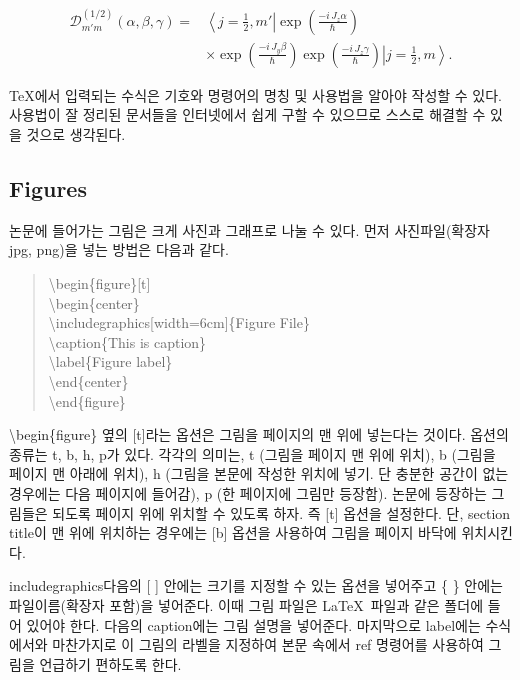 \documentclass{gshs-report-v1.1}
\begin{document}
\begin{equation}
\begin{split}
\mathcal{D}_{m'm}^{(1/2)} (\alpha,\beta,\gamma)=&\left\langle j=\frac{1}{2},m'\right|\exp\left(\frac{-i\,J_z \alpha}{\hbar}\right)\\
&\times\exp\left(\frac{-i\,J_y \beta}{\hbar}\right)\exp\left(\frac{-i\,J_z \gamma}{\hbar}\right)\left| j=\frac{1}{2},m\right\rangle.
\end{split}
\label{eq004}
\end{equation}

\TeX 에서 입력되는 수식은 기호와 명령어의 명칭 및 사용법을 알아야 작성할 수 있다. 사용법이 잘 정리된 문서들을 인터넷에서 쉽게 구할 수 있으므로 스스로 해결할 수 있을 것으로 생각된다.


\subsection{Figures}
논문에 들어가는 그림은 크게 사진과 그래프로 나눌 수 있다. 먼저 사진파일(확장자 jpg, png)을 넣는 방법은 다음과 같다.
\begin{quote}
	{\textbackslash}begin\{figure\}[t]\\
	{\textbackslash}begin\{center\}\\
	{\textbackslash}includegraphics[width=6cm]\{Figure File\}\\
	{\textbackslash}caption\{This is caption\}\\
	{\textbackslash}label\{Figure label\}\\
	{\textbackslash}end\{center\}\\
	{\textbackslash}end\{figure\}
\end{quote}
{\textbackslash}begin\{figure\} 옆의 [t]라는 옵션은 그림을 페이지의 맨 위에 넣는다는 것이다. 옵션의 종류는 t, b, h, p가 있다. 각각의 의미는, t (그림을 페이지 맨 위에 위치), b (그림을 페이지 맨 아래에 위치), h (그림을 본문에 작성한 위치에 넣기. 단 충분한 공간이 없는 경우에는 다음 페이지에 들어감), p (한 페이지에 그림만 등장함). 논문에 등장하는 그림들은 되도록 페이지 위에 위치할 수 있도록 하자. 즉 [t] 옵션을 설정한다. 단, section title이 맨 위에 위치하는 경우에는 [b] 옵션을 사용하여 그림을 페이지 바닥에 위치시킨다.

includegraphics다음의 [ ] 안에는 크기를 지정할 수 있는 옵션을 넣어주고 \{ \} 안에는 파일이름(확장자 포함)을 넣어준다. 이때 그림 파일은 \LaTeX\ 파일과 같은 폴더에 들어 있어야 한다. 다음의 caption에는 그림 설명을 넣어준다. 마지막으로 label에는 수식에서와 마찬가지로 이 그림의 라벨을 지정하여 본문 속에서 ref 명령어를 사용하여 그림을 언급하기 편하도록 한다.
\end{document}
